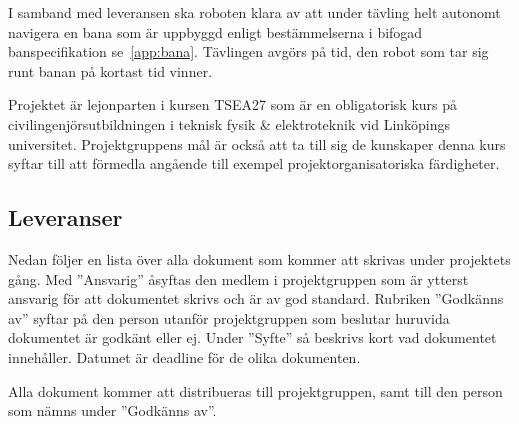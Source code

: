 \documentclass[a4paper,12pt]{article}
\begin{document}
I samband med leveransen ska roboten klara av att under tävling helt autonomt navigera en bana som är uppbyggd enligt bestämmelserna i  bifogad banspecifikation se~\ref{app:bana}. Tävlingen avgörs på tid, den robot som tar sig runt banan på kortast tid vinner. 

Projektet är lejonparten i kursen TSEA27  som är en obligatorisk kurs på civilingenjörsutbildningen i teknisk fysik \& elektroteknik vid Linköpings universitet. Projektgruppens mål är också att ta till sig de kunskaper denna kurs syftar till att förmedla angående till exempel projektorganisatoriska färdigheter. 
 
\subsection{Leveranser}
Nedan följer en lista över alla dokument som kommer att skrivas under projektets gång. Med ''Ansvarig'' åsyftas den medlem i projektgruppen som är ytterst ansvarig för att dokumentet skrivs och är av god standard. Rubriken ''Godkänns av'' syftar på den person utanför projektgruppen som beslutar huruvida dokumentet är godkänt eller ej. Under ''Syfte'' så beskrivs kort vad dokumentet innehåller. Datumet är deadline för de olika dokumenten. 

Alla dokument kommer att distribueras till projektgruppen, samt till den person som nämns under ''Godkänns av''.
\end{document}
